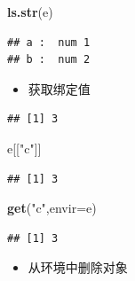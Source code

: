 \documentclass[]{book}
\newenvironment{Shaded}{\begin{snugshade}}{\end{snugshade}}
\newcommand{\KeywordTok}[1]{\textcolor[rgb]{0.13,0.29,0.53}{\textbf{#1}}}
\newcommand{\DataTypeTok}[1]{\textcolor[rgb]{0.13,0.29,0.53}{#1}}
\newcommand{\DecValTok}[1]{\textcolor[rgb]{0.00,0.00,0.81}{#1}}
\newcommand{\StringTok}[1]{\textcolor[rgb]{0.31,0.60,0.02}{#1}}
\newcommand{\CommentTok}[1]{\textcolor[rgb]{0.56,0.35,0.01}{\textit{#1}}}
\newcommand{\OtherTok}[1]{\textcolor[rgb]{0.56,0.35,0.01}{#1}}
\newcommand{\OperatorTok}[1]{\textcolor[rgb]{0.81,0.36,0.00}{\textbf{#1}}}
\newcommand{\NormalTok}[1]{#1}
\providecommand{\tightlist}{%
  \setlength{\itemsep}{0pt}\setlength{\parskip}{0pt}}
\begin{document}
\begin{Shaded}
\begin{Highlighting}[]
\KeywordTok{ls.str}\NormalTok{(e)}
\end{Highlighting}
\end{Shaded}

\begin{verbatim}
## a :  num 1
## b :  num 2
\end{verbatim}

\begin{itemize}
\tightlist
\item
  获取绑定值
\end{itemize}

\begin{Shaded}
\end{Shaded}

\begin{verbatim}
## [1] 3
\end{verbatim}

\begin{Shaded}
\begin{Highlighting}[]
\NormalTok{e[[}\StringTok{"c"}\NormalTok{]]}
\end{Highlighting}
\end{Shaded}

\begin{verbatim}
## [1] 3
\end{verbatim}

\begin{Shaded}
\begin{Highlighting}[]
\KeywordTok{get}\NormalTok{(}\StringTok{"c"}\NormalTok{,}\DataTypeTok{envir=}\NormalTok{e)}
\end{Highlighting}
\end{Shaded}

\begin{verbatim}
## [1] 3
\end{verbatim}

\begin{itemize}
\tightlist
\item
  从环境中删除对象
\end{itemize}

\begin{Shaded}
\end{Shaded}
\end{document}
